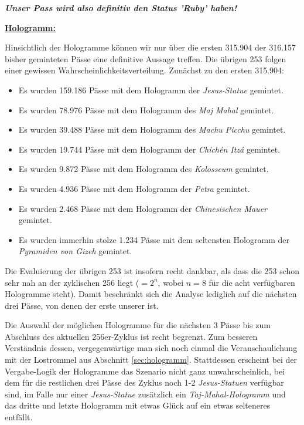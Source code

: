 \vspace{0.2cm}

\textit{\textbf{Unser Pass wird also definitiv den Status 'Ruby' haben!}}

\vspace{1.0cm}


\underline{\textbf{Hologramm:}}

\vspace{0.2cm}

Hinsichtlich der Hologramme können wir nur über die ersten 315.904 der 316.157 bisher geminteten Pässe eine definitive Aussage treffen. Die übrigen 253 folgen einer gewissen Wahrscheinlichkeitsverteilung. Zunächst zu den ersten 315.904:

\begin{itemize}
  \item Es wurden 159.186 Pässe mit dem Hologramm der \textit{Jesus-Statue} gemintet.
  \item Es wurden 78.976 Pässe mit dem Hologramm des \textit{Maj Mahal} gemintet.
  \item Es wurden 39.488 Pässe mit dem Hologramm des \textit{Machu Picchu} gemintet.
  \item Es wurden 19.744 Pässe mit dem Hologramm der \textit{Chichén Itzá} gemintet.
  \item Es wurden 9.872 Pässe mit dem Hologramm des \textit{Kolosseum} gemintet.
  \item Es wurden 4.936 Pässe mit dem Hologramm der \textit{Petra} gemintet.
  \item Es wurden 2.468 Pässe mit dem Hologramm der \textit{Chinesischen Mauer} gemintet.
  \item Es wurden immerhin stolze 1.234 Pässe mit dem seltensten Hologramm der \textit{Pyramiden von Gizeh} gemintet.
\end{itemize}

\vspace{0.3cm}

Die Evaluierung der übrigen 253 ist insofern recht dankbar, als dass die 253 schon sehr nah an der zyklischen 256 liegt ($= 2^{n}$, wobei $n=8$ für die acht verfügbaren Hologramme steht). Damit beschränkt sich die Analyse lediglich auf die nächsten drei Pässe, von denen der erste unserer ist. 

Die Auswahl der möglichen Hologramme für die nächsten 3 Pässe bis zum Abschluss des aktuellen 256er-Zyklus ist recht begrenzt. Zum besseren Verständnis dessen, vergegenwärtige man sich noch einmal die Veranschaulichung mit der Lostrommel aus Abschnitt \ref{sec:hologramm}. Stattdessen erscheint bei der Vergabe-Logik der Hologramme das Szenario nicht ganz unwahrscheinlich, bei dem für die restlichen drei Pässe des Zyklus noch 1-2 \textit{Jesus-Statuen} verfügbar sind, im Falle nur einer \textit{Jesus-Statue} zusätzlich ein \textit{Taj-Mahal-Hologramm} und das dritte und letzte Hologramm mit etwas Glück auf ein etwas selteneres entfällt.

